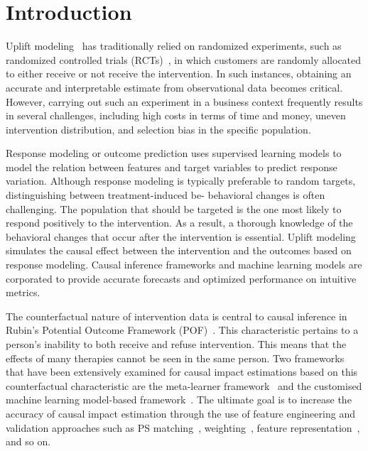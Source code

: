 \documentclass[sigconf,screen]{acmart}
\begin{document}
\maketitle

\section{Introduction}
Uplift modeling~\citep{uplift_modeling} has traditionally relied on randomized experiments, such as randomized controlled trials (RCTs)~\citep{RCT}, in which customers are randomly allocated to either receive or not receive the intervention. In such instances, obtaining an accurate and interpretable estimate from observational data becomes critical. However, carrying out such an experiment in a business context frequently results in several challenges, including high costs in terms of time and money, uneven intervention distribution, and selection bias in the specific population.

Response modeling or outcome prediction uses supervised learning models to model the relation between features and target variables to predict response variation. Although response modeling is typically preferable to random targets, distinguishing between treatment-induced be- behavioral changes is often challenging. The population that should be targeted is the one most likely to respond positively to the intervention. As a result, a thorough knowledge of the behavioral changes that occur after the intervention is essential. Uplift modeling simulates the causal effect between the intervention and the outcomes based on response modeling. Causal inference frameworks and machine learning models are corporated to provide accurate forecasts and optimized performance on intuitive metrics.

The counterfactual nature of intervention data is central to causal inference in Rubin's Potential Outcome Framework (POF)~\citep{rubin2005causal}. This characteristic pertains to a person's inability to both receive and refuse intervention. This means that the effects of many therapies cannot be seen in the same person. Two frameworks that have been extensively examined for causal impact estimations based on this counterfactual characteristic are the meta-learner framework~\citep{meta:Ton} and the customised machine learning model-based framework~\citep{ML:Chen}. The ultimate goal is to increase the accuracy of causal impact estimation through the use of feature engineering and validation approaches such as PS matching~\citep{PSM:Caliendo}, weighting~\citep{weighting:Li}, feature representation~\citep{fe:Muandet}, and so on.
\end{document}
